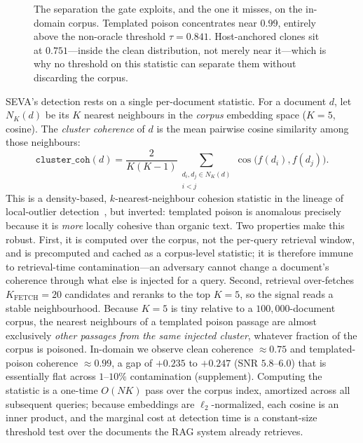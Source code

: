 \documentclass[10pt,journal,compsoc]{IEEEtran}
\begin{document}
\begin{figure}[t]
\caption{The separation the gate exploits, and the one it misses, on the in-domain corpus.
Templated poison concentrates near $0.99$, entirely above the non-oracle threshold
$\tau=0.841$. Host-anchored clones sit at $0.751$---inside the clean distribution, not merely
near it---which is why no threshold on this statistic can separate them without discarding the
corpus.}
\label{fig:dist}
\end{figure}
SEVA's detection rests on a single per-document statistic. For a document $d$,
let $N_K(d)$ be its $K$ nearest neighbours in the \emph{corpus} embedding space
($K=5$, cosine). The \emph{cluster coherence} of $d$ is the mean pairwise cosine
similarity among those neighbours:
\[
\texttt{cluster\_coh}(d) = \frac{2}{K(K-1)}
\sum_{\substack{d_i,d_j \in N_K(d)\\ i<j}} \cos\!\big(f(d_i),f(d_j)\big).
\]
This is a density-based, $k$-nearest-neighbour cohesion statistic in the lineage of
local-outlier detection~\cite{lof}, but inverted: templated poison is anomalous
precisely because it is \emph{more} locally cohesive than organic text.
Two properties make this robust. First, it is computed over the corpus, not the
per-query retrieval window, and is precomputed and cached as a corpus-level
statistic; it is therefore immune to retrieval-time contamination---an adversary
cannot change a document's coherence through what else is injected for a query.
Second, retrieval over-fetches $K_{\mathrm{FETCH}}=20$ candidates and reranks to
the top $K=5$, so the signal reads a stable neighbourhood. Because $K=5$ is tiny
relative to a $100{,}000$-document corpus, the nearest neighbours of a templated
poison passage are almost exclusively \emph{other passages from the same injected
cluster}, whatever fraction of the corpus is poisoned. In-domain we observe clean
coherence $\approx 0.75$ and templated-poison coherence $\approx 0.99$, a gap of
$+0.235$ to $+0.247$ (SNR $5.8$--$6.0$) that is essentially flat across $1$--$10\%$
contamination (supplement).
Computing the statistic is a one-time $O(NK)$ pass over the corpus index, amortized
across all subsequent queries; because embeddings are $\ell_2$-normalized, each
cosine is an inner product, and the marginal cost at detection time is a
constant-size threshold test over the documents the RAG system already retrieves.
\end{document}
